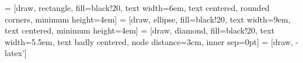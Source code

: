 %
%

 = [draw, rectangle, fill=black!20, text width=6em, text centered, rounded corners, minimum height=4em]
 = [draw, ellipse, fill=black!20, text width=9em, text centered, minimum height=4em]
 = [draw, diamond, fill=black!20, text width=5.5em, text badly centered, node distance=3cm, inner sep=0pt]
 = [draw, -latex']